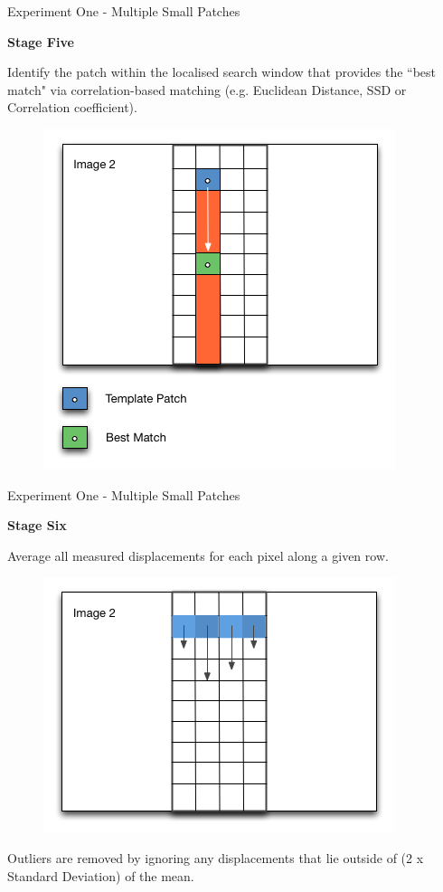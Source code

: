 \documentclass[10pt, compress]{beamer}
\begin{document}
\begin{frame}{Experiment One - Multiple Small Patches}

\textbf{Stage Five} \\ \vspace{0.2cm}

Identify the patch within the localised search window that provides the ``best match" via correlation-based matching (e.g. Euclidean Distance, SSD or Correlation coefficient). 

\begin{figure}[ht!]
\centering
\includegraphics[scale=0.35]{stage4.png}
\end{figure}

\end{frame}

\begin{frame}{Experiment One - Multiple Small Patches}

\textbf{Stage Six} \\ \vspace{0.2cm}

Average all measured displacements for each pixel along a given row.

\begin{figure}[ht!]
\centering
\includegraphics[scale=0.4]{stage5.png}
\end{figure}

Outliers are removed by ignoring any displacements that lie outside of (2 x Standard Deviation) of the mean.

\end{frame}
\end{document}

